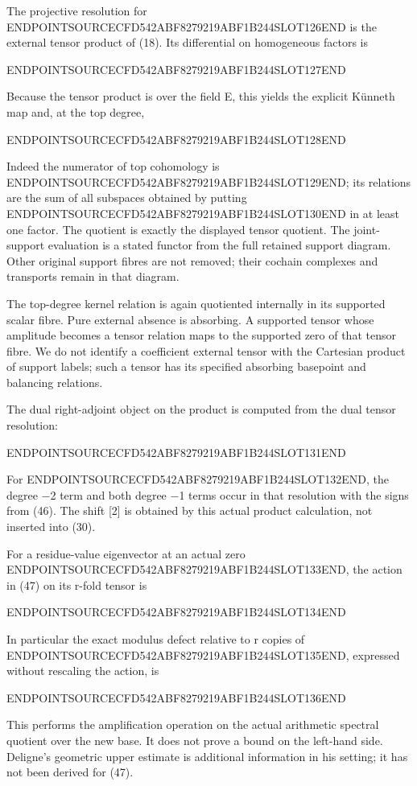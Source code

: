 The projective resolution for ENDPOINTSOURCECFD542ABF8279219ABF1B244SLOT126END is the external tensor product of (18). Its differential on homogeneous factors is

ENDPOINTSOURCECFD542ABF8279219ABF1B244SLOT127END

Because the tensor product is over the field E, this yields the explicit Künneth map and, at the top degree,

ENDPOINTSOURCECFD542ABF8279219ABF1B244SLOT128END

Indeed the numerator of top cohomology is ENDPOINTSOURCECFD542ABF8279219ABF1B244SLOT129END; its relations are the sum of all subspaces obtained by putting ENDPOINTSOURCECFD542ABF8279219ABF1B244SLOT130END in at least one factor. The quotient is exactly the displayed tensor quotient. The joint-support evaluation is a stated functor from the full retained support diagram. Other original support fibres are not removed; their cochain complexes and transports remain in that diagram.

The top-degree kernel relation is again quotiented internally in its supported scalar fibre. Pure external absence is absorbing. A supported tensor whose amplitude becomes a tensor relation maps to the supported zero of that tensor fibre. We do not identify a coefficient external tensor with the Cartesian product of support labels; such a tensor has its specified absorbing basepoint and balancing relations.

The dual right-adjoint object on the product is computed from the dual tensor resolution:

ENDPOINTSOURCECFD542ABF8279219ABF1B244SLOT131END

For ENDPOINTSOURCECFD542ABF8279219ABF1B244SLOT132END, the degree −2 term and both degree −1 terms occur in that resolution with the signs from (46). The shift {[}2{]} is obtained by this actual product calculation, not inserted into (30).

For a residue-value eigenvector at an actual zero ENDPOINTSOURCECFD542ABF8279219ABF1B244SLOT133END, the action in (47) on its r-fold tensor is

ENDPOINTSOURCECFD542ABF8279219ABF1B244SLOT134END

In particular the exact modulus defect relative to r copies of ENDPOINTSOURCECFD542ABF8279219ABF1B244SLOT135END, expressed without rescaling the action, is

ENDPOINTSOURCECFD542ABF8279219ABF1B244SLOT136END

This performs the amplification operation on the actual arithmetic spectral quotient over the new base. It does not prove a bound on the left-hand side. Deligne's geometric upper estimate is additional information in his setting; it has not been derived for (47).

